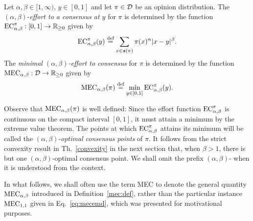 \begin{definition}\label{mec:def} Let $\alpha,\beta \in [1,\infty)$, $y \in [0,1]$ and let $\pi \in \mathcal{D}$ be an opinion distribution. 
The $(\alpha,\beta)$-\emph{effort to a consensus at $y$} for $\pi$ is determined by the function   $\EC:[0,1]\to \PositiveReals$ given by \begin{equation}    
\EC(y)\defsymbol\sum_{x \in \support(\pi)}\pi(x)^\alpha |x - y|^\beta.
\end{equation}
The \emph{minimal  $(\alpha,\beta)$-effort to consensus} for $\pi$ is determined by the function $\MEC: \Dset\to\Reals_{\geq 0}$ given by \begin{equation}    
\MEC(\pi) \defsymbol  \min_{y\in[0,1]} {\EC}(y).
\end{equation}
 \end{definition}
Observe that \(\MEC(\pi)\) is well defined: Since the effort function \(\EC\) is continuous on the compact interval \([0,1]\), it must attain a minimum by the extreme value theorem. The points at which \(\EC\) attains its minimum will be called the $(\alpha,\beta)$-\emph{optimal consensus points} of $\pi$.  It follows from the strict convexity result in Th.~\ref{convexity} in the next section that, when \(\beta>1\), there is but one $(\alpha,\beta)$-optimal consensus point. We shall omit the prefix $(\alpha,\beta)$- when it is understood from the context. 

\begin{remark}
In what follows, we shall often use the term MEC to denote the general quantity $\MEC$ introduced in Definition~\ref{mec:def}, rather than the particular instance $\MEC[1,1]$ given in Eq.~\ref{eq:mecemd}, which was presented for motivational purposes.
\end{remark}


